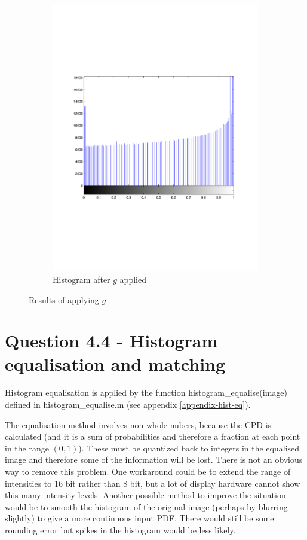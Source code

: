 \documentclass[a4paper]{article}
\begin{document}
\begin{figure}[h!]
\begin{subfigure}[b]{0.3\textwidth}
                \includegraphics[width=\textwidth]{q3-afterhist}
                \caption{Histogram after $g$ applied}
                \label{fig:ah}
        \end{subfigure}
        \caption{Results of applying $g$}\label{fig:43compare}
\end{figure}


\section*{Question 4.4 - Histogram equalisation and matching} 
Histogram equalisation is applied by the function histogram\_equalise(image) defined in histogram\_equalise.m (see appendix \ref{appendix-hist-eq}).

The equalisation method involves non-whole nubers, because the CPD is calculated (and it is a sum of probabilities and therefore a fraction at each point in the range $(0,1)$). These must be quantized back to integers in the equalised image and therefore some of the information will be lost. There is not an obvious way to remove this problem. One workaround could be to extend the range of intensities to 16 bit rather than 8 bit, but a lot of display hardware cannot show this many intensity levels. Another possible method to improve the situation would be to smooth the histogram of the original image (perhaps by blurring slightly) to give a more continuous input PDF. There would still be some rounding error but spikes in the histogram would be less likely.
\end{document}
